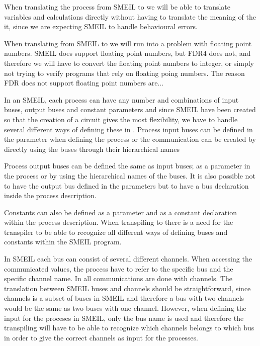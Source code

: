 When translating the process from SMEIL to \cspm we will be able to translate variables and calculations directly without having to translate the meaning of the it, since we are expecting SMEIL to handle behavioural errors.

When translating from SMEIL to \cspm we will run into a problem with floating point numbers. SMEIL does support floating point numbers, but FDR4 does not,  and therefore we will have to convert the floating point numbers to integer, or simply not trying to verify programs that rely on floating poing numbers. The reason FDR does not support floating point numbers are... %


In an SMEIL, each process can have any number and combinations of input buses, output buses and constant parameters and since SMEIL have been created so that the creation of a circuit gives the most flexibility, we have to handle several different ways of defining these in \cspm.
Process input buses can be defined in the parameter when defining the process or the communication can be created by directly using the buses through their hierarchical names %

Process output buses can be defined the same as input buses; as a parameter in the process or by using the hierarchical names of the buses. It is also possible not to have the output bus defined in the parameters but to have a bus declaration inside the process description.

Constants can also be defined as a parameter and as a constant declaration within the process description. %
When transpiling to \cspm there is a need for the transpiler to be able to recognize all different ways of defining buses and constants within the SMEIL program.

In SMEIL each bus can consist of several different channels. When accessing the communicated values, the process have to refer to the specific bus and the specific channel name. In \cspm all communications are done with channels. The translation between SMEIL buses and \cspm channels should be straightforward, since channels is a subset of buses in SMEIL and therefore a bus with two channels would be the same as two buses with one channel. However, when defining the input for the proceses in SMEIL, only the bus name is used and therefore the transpiling will have to be able to recognize which channels belongs to which bus in order to give the correct channels as input for the \cspm processes.



